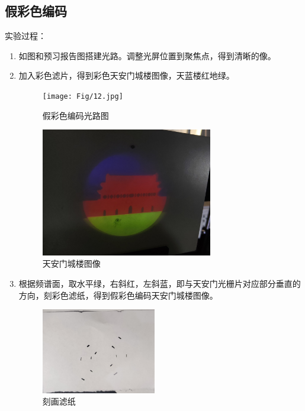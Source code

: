 \documentclass[11pt]{article}
\begin{document}
\subsection{假彩色编码}
\noindent 实验过程：
\begin{enumerate}
    \item 如图和预习报告图搭建光路。调整光屏位置到聚焦点，得到清晰的像。
    \item 加入彩色滤片，得到彩色天安门城楼图像，天蓝楼红地绿。
    \begin{figure}[H]
        \centering
        \begin{minipage}[t]{0.49\linewidth}
            \centering
            \texttt{[image: Fig/12.jpg]}
            \caption{假彩色编码光路图}
        \end{minipage}
        \begin{minipage}[t]{0.49\linewidth}
            \centering
            \includegraphics[width=7.5cm]{Fig/13.jpg}
            \caption{天安门城楼图像}
        \end{minipage}
    \end{figure}
    \item 根据频谱面，取水平绿，右斜红，左斜蓝，即与天安门光栅片对应部分垂直的方向，刻彩色滤纸，得到假彩色编码天安门城楼图像。
    \begin{figure}[H]
        \centering
        \begin{minipage}[t]{0.33\linewidth}
            \centering
            \includegraphics[width=5cm]{Fig/14.jpg}
            \caption{刻画滤纸}
        \end{minipage}
        \begin{minipage}[t]{0.33\linewidth}

\end{minipage}
\end{figure}
\end{enumerate}
\end{document}
